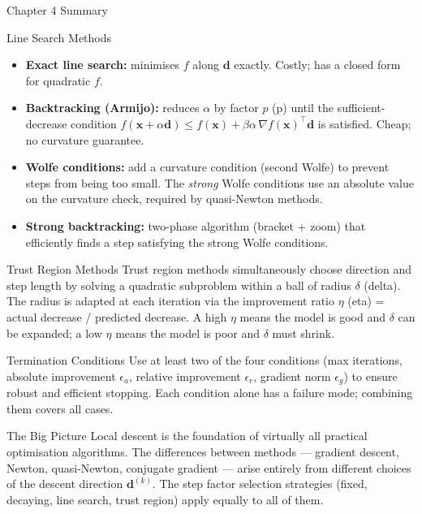 \documentclass[aspectratio=169,10pt]{beamer}
\newcommand{\bx}{\mathbf{x}}
\newcommand{\bd}{\mathbf{d}}
\newcommand{\grad}{\nabla}
\begin{document}
\begin{frame}[allowframebreaks]{Chapter 4 Summary}
  \begin{block}{Line Search Methods}
    \begin{itemize}
      \item \textbf{Exact line search:} minimises $f$ along $\bd$
            exactly.  Costly; has a closed form for quadratic $f$.
      \item \textbf{Backtracking (Armijo):} reduces $\alpha$ by factor
            $p$ (p) until the sufficient-decrease condition
            $f(\bx+\alpha\bd) \le f(\bx) + \beta\alpha\,\grad
            f(\bx)^{\top}\bd$ is satisfied.  Cheap; no curvature
            guarantee.
      \item \textbf{Wolfe conditions:} add a curvature condition
            (second Wolfe) to prevent steps from being too small.
            The \emph{strong} Wolfe conditions use an absolute value
            on the curvature check, required by quasi-Newton methods.
      \item \textbf{Strong backtracking:} two-phase algorithm
            (bracket + zoom) that efficiently finds a step satisfying
            the strong Wolfe conditions.
    \end{itemize}
  \end{block}

  \begin{block}{Trust Region Methods}
    Trust region methods simultaneously choose direction and step length
    by solving a quadratic subproblem within a ball of radius $\delta$
    (delta).  The radius is adapted at each iteration via the improvement
    ratio $\eta$ (eta) = actual decrease / predicted decrease.  A high
    $\eta$ means the model is good and $\delta$ can be expanded; a low
    $\eta$ means the model is poor and $\delta$ must shrink.
  \end{block}

  \begin{block}{Termination Conditions}
    Use at least two of the four conditions (max iterations, absolute
    improvement $\epsilon_a$, relative improvement $\epsilon_r$, gradient
    norm $\epsilon_g$) to ensure robust and efficient stopping.  Each
    condition alone has a failure mode; combining them covers all cases.
  \end{block}

  \begin{alertblock}{The Big Picture}
    Local descent is the foundation of virtually all practical
    optimisation algorithms.  The differences between methods --- gradient
    descent, Newton, quasi-Newton, conjugate gradient --- arise entirely
    from different choices of the descent direction $\bd^{(k)}$.  The
    step factor selection strategies (fixed, decaying, line search, trust
    region) apply equally to all of them.
  \end{alertblock}

\end{frame}
\end{document}
